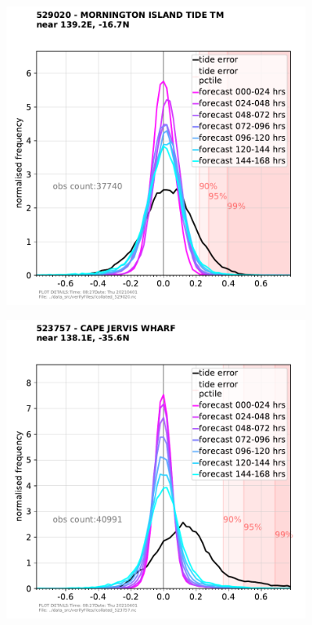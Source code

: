 \begin{frame}
\begin{columns}
\begin{column}{0.3\textwidth}
\begin{figure}
      \end{figure}
    \end{column}
    \begin{column}{0.3\textwidth}
      \begin{figure}      
        \includegraphics[width=\textwidth]{figures/plots/529020_plot_verify_pdf.pdf}
      \end{figure}
      \begin{figure}      
        \includegraphics[width=\textwidth]{figures/plots/523757_plot_verify_pdf.pdf}

\end{figure}
\end{column}
\end{columns}
\end{frame}
